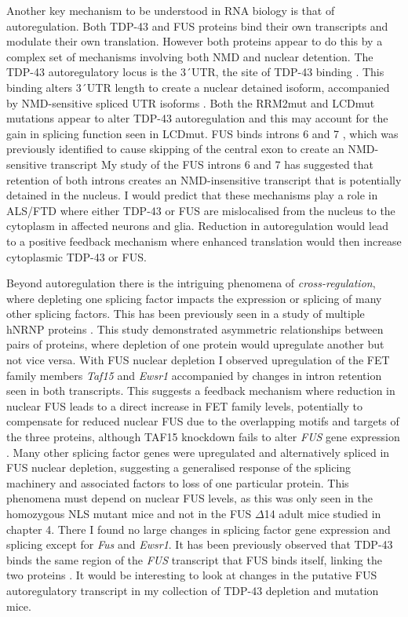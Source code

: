 Another key mechanism to be understood in RNA biology is that of autoregulation.
Both TDP-43 and FUS proteins bind their own transcripts and modulate their own translation.
However both proteins appear to do this by a complex set of mechanisms involving both NMD and nuclear detention.
The TDP-43 autoregulatory locus is the 3\'\ UTR, the site of TDP-43 binding \citep{Polymenidou2011}. 
This binding alters 3\'\ UTR length to create a nuclear detained isoform, accompanied by NMD-sensitive spliced UTR isoforms \citep{Ayala2011,Koyama2016}.
Both the RRM2mut and LCDmut mutations appear to alter TDP-43 autoregulation and this may account for the gain in splicing function seen in LCDmut.
FUS binds introns 6 and 7 \citep{Lagier-Tourenne2012}, which was previously identified to cause skipping of the central exon to create an NMD-sensitive transcript \citep{Zhou2013}
My study of the FUS introns 6 and 7 has suggested that retention of both introns creates an NMD-insensitive transcript that is potentially detained in the nucleus.
I would predict that these mechanisms play a role in ALS/FTD where either TDP-43 or FUS are mislocalised from the nucleus to the cytoplasm in affected neurons and glia.
Reduction in autoregulation would lead to a positive feedback mechanism where enhanced translation would then increase cytoplasmic TDP-43 or FUS.

Beyond autoregulation there is the intriguing phenomena of \textit{cross-regulation}, where depleting one splicing factor impacts the expression or splicing of many other splicing factors.
This has been previously seen in a study of multiple hNRNP proteins \citep{Huelga2012}. 
This study demonstrated asymmetric relationships between pairs of proteins, where depletion of one protein would upregulate another but not vice versa.
With FUS nuclear depletion I observed upregulation of the FET family members \textit{Taf15} and \textit{Ewsr1} accompanied by changes in intron retention seen in both transcripts. 
This suggests a feedback mechanism where reduction in nuclear FUS leads to a direct increase in FET family levels, potentially to compensate for reduced nuclear FUS due to the overlapping motifs and targets of the three proteins, although TAF15 knockdown fails to alter \textit{FUS} gene expression \citep{Kapeli2016}.
Many other splicing factor genes were upregulated and alternatively spliced in FUS nuclear depletion, suggesting a generalised response of the splicing machinery and associated factors to loss of one particular protein. 
This phenomena must depend on nuclear FUS levels, as this was only seen in the homozygous NLS mutant mice and not in the FUS $\Delta$14 adult mice studied in chapter 4.
There I found no large changes in splicing factor gene expression and splicing except for \textit{Fus} and \textit{Ewsr1}.
It has been previously observed that TDP-43 binds the same region of the \textit{FUS} transcript that FUS binds itself, linking the two proteins \citep{Lagier-Tourenne2012}.
It would be interesting to look at changes in the putative FUS autoregulatory transcript in my collection of TDP-43 depletion and mutation mice.

